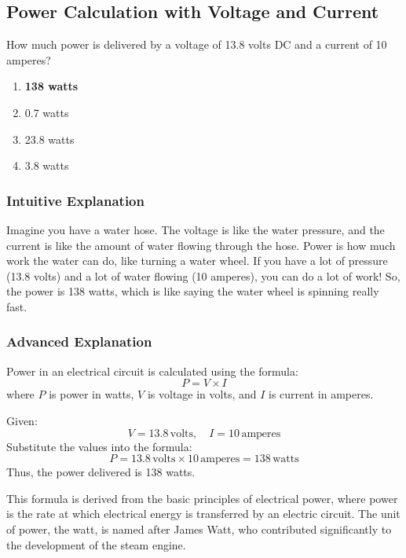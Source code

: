 \subsection{Power Calculation with Voltage and Current}
\label{T5C09}

\begin{tcolorbox}[colback=gray!10!white,colframe=black!75!black,title=T5C09]
How much power is delivered by a voltage of 13.8 volts DC and a current of 10 amperes?
\begin{enumerate}[label=\Alph*)]
    \item \textbf{138 watts}
    \item 0.7 watts
    \item 23.8 watts
    \item 3.8 watts
\end{enumerate}
\end{tcolorbox}

\subsubsection{Intuitive Explanation}
Imagine you have a water hose. The voltage is like the water pressure, and the current is like the amount of water flowing through the hose. Power is how much work the water can do, like turning a water wheel. If you have a lot of pressure (13.8 volts) and a lot of water flowing (10 amperes), you can do a lot of work! So, the power is 138 watts, which is like saying the water wheel is spinning really fast.

\subsubsection{Advanced Explanation}
Power in an electrical circuit is calculated using the formula:
\[
P = V \times I
\]
where \( P \) is power in watts, \( V \) is voltage in volts, and \( I \) is current in amperes.

Given:
\[
V = 13.8 \, \text{volts}, \quad I = 10 \, \text{amperes}
\]
Substitute the values into the formula:
\[
P = 13.8 \, \text{volts} \times 10 \, \text{amperes} = 138 \, \text{watts}
\]
Thus, the power delivered is 138 watts.

This formula is derived from the basic principles of electrical power, where power is the rate at which electrical energy is transferred by an electric circuit. The unit of power, the watt, is named after James Watt, who contributed significantly to the development of the steam engine.

